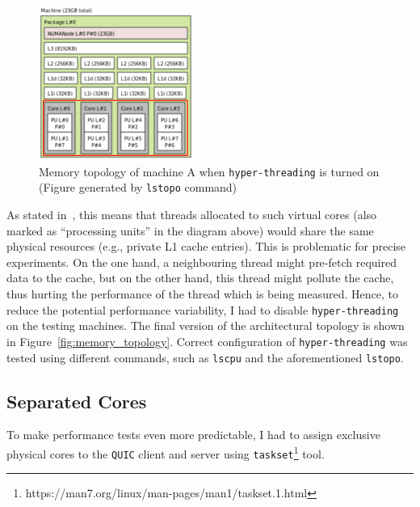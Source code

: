 \documentclass[12pt,a4paper]{report}
\begin{document}
    \begin{figure}[ht]
    \centering
    \includegraphics[width=0.45\textwidth]{figs/topology_with_hyperthreading.png}
    \caption[Memory topology of machine A when \texttt{hyper-threading} is turned on]{Memory topology of machine A when \texttt{hyper-threading} is turned on (Figure generated by \texttt{lstopo} command)}
    \label{fig:topology_with_hyperthreading}
    \end{figure}

As stated in~\cite{hyperthreading_book}, this means that threads allocated to such virtual cores (also marked as \enquote{processing units} in the diagram above) would share the same physical resources (e.g., private L1 cache entries).
This is problematic for precise experiments.
On the one hand, a neighbouring thread might pre-fetch required data to the cache, but on the other hand, this thread might pollute the cache, thus hurting the performance of the thread which is being measured.
Hence, to reduce the potential performance variability, I had to disable \texttt{hyper-threading} on the testing machines.
The final version of the architectural topology is shown in Figure~\ref{fig:memory_topology}. 
Correct configuration of \texttt{hyper-threading} was tested using different commands, such as \texttt{lscpu} and the aforementioned \texttt{lstopo}. 

    
    
\subsection{Separated Cores} \label{SeparatedCores_Subsection_Tag}
To make performance tests even more predictable, I had to assign exclusive physical cores to the \texttt{QUIC} client and server using \texttt{taskset}\footnote{https://man7.org/linux/man-pages/man1/taskset.1.html} tool.
\end{document}
